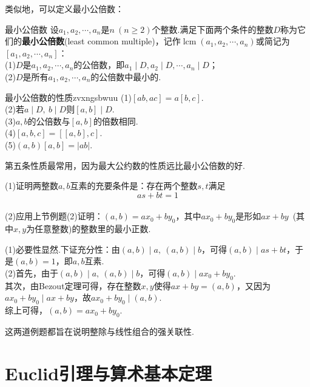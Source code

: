 \documentclass[lang=cn, zihao=5]{elegantbook}
\DeclareMathOperator{\lcm}{lcm}
\begin{document}
类似地，可以定义最小公倍数：

\begin{definition}{最小公倍数}
	设$a_1,a_2, \cdots ,a_n$是$n~(n \geq 2)$个整数.满足下面两个条件的整数$D$称为它们的\textbf{最小公倍数}(least common multiple)，记作$\lcm (a_1,a_2, \cdots ,a_n)$或简记为$[a_1,a_2, \cdots ,a_n]$： \\
	(1)$D$是$a_1,a_2, \cdots ,a_n$的公倍数，即$a_1 \mid D,a_2 \mid D, \cdots ,a_n \mid D$； \\
	(2)$D$是所有$a_1,a_2, \cdots ,a_n$的公倍数中最小的.
\end{definition}

\begin{theorem}{最小公倍数的性质}{zvxngsbwuu}
	(1)$[ab,ac]=a[b,c]$. \\
	(2)若$a \mid D,~b \mid D$则$[a,b] \mid D$. \\
	(3)$a,b$的公倍数与$[a,b]$的倍数相同. \\
	(4)$[a,b,c]=[[a,b],c]$. \\
	(5)$(a,b)[a,b]=|ab|$.
\end{theorem}
\begin{remark}
	第五条性质最常用，因为最大公约数的性质远比最小公倍数的好.
\end{remark}

\begin{example} %
	(1)证明两整数$a,b$互素的充要条件是：存在两个整数$s,t$满足$$as+bt=1$$ \\
	(2)应用上节例题(2)证明：$(a,b)=ax_0+by_0$，其中$ax_0+by_0$是形如$ax+by$~(其中$x,y$为任意整数)的整数里的最小正数.
\end{example}
\begin{solution}
	(1)必要性显然.下证充分性：由$(a,b) \mid a,~(a,b) \mid b$，可得$(a,b) \mid as+bt$，于是$(a,b)=1$，即$a,b$互素. \\
	(2)首先，由于$(a,b) \mid a,~(a,b) \mid b$，可得$(a,b) \mid ax_0+by_0$. \\
	其次，由Bezout定理可得，存在整数$x,y$使得$ax+by = (a,b)$，又因为$ax_0 + by_0 \mid ax+by$，故$ax_0 + by_0 \mid (a,b)$. \\
	综上可得，$(a,b)=ax_0+by_0$.
\end{solution}
\begin{remark}
	这两道例题都旨在说明整除与线性组合的强关联性.
\end{remark}

\section{Euclid引理与算术基本定理}
\end{document}
